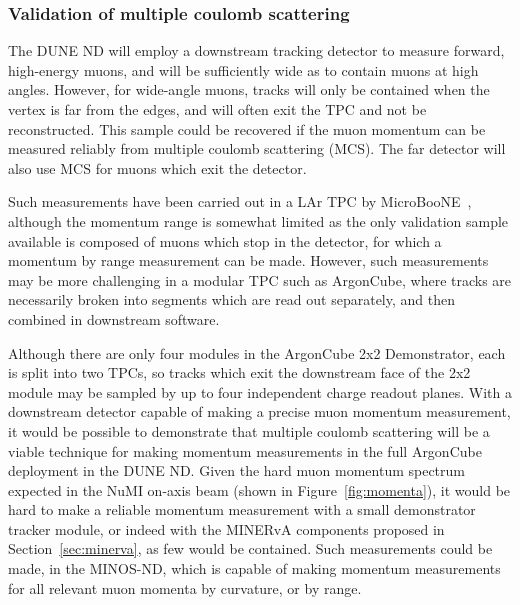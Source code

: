 \subsubsection{Validation of multiple coulomb scattering}

The DUNE ND will employ a downstream tracking detector to measure forward, high-energy muons, and will be sufficiently wide as to contain muons at high angles.  However, for wide-angle muons, tracks will only be contained when the vertex is far from the edges, and will often exit the TPC and not be reconstructed.  This sample could be recovered if the muon momentum can be measured reliably from multiple coulomb scattering (MCS). The far detector will also use MCS for muons which exit the detector.

Such measurements have been carried out in a LAr TPC by MicroBooNE~\cite{Abratenko:2017nki}, although the momentum range is somewhat limited as the only validation sample available is composed of muons which stop in the detector, for which a momentum by range measurement can be made. However, such measurements may be more challenging in a modular TPC such as ArgonCube, where tracks are necessarily broken into segments which are read out separately, and then combined in downstream software.

Although there are only four modules in the ArgonCube 2x2 Demonstrator, each is split into two TPCs, so tracks which exit the downstream face of the 2x2 module may be sampled by up to four independent charge readout planes. With a downstream detector capable of making a precise muon momentum measurement, it would be possible to demonstrate that multiple coulomb scattering will be a viable technique for making momentum measurements in the full ArgonCube deployment in the DUNE ND. Given the hard muon momentum spectrum expected in the NuMI on-axis beam (shown in Figure~\ref{fig:momenta}), it would be hard to make a reliable momentum measurement with a small demonstrator tracker module, or indeed with the MINERvA components proposed in Section~\ref{sec:minerva}, as few would be contained. Such measurements could be made, in the MINOS-ND, which is capable of making momentum measurements for all relevant muon momenta by curvature, or by range.

